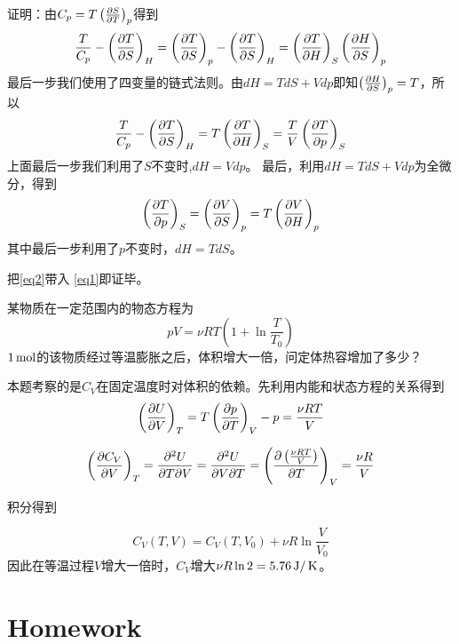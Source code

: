 \documentclass[CJK]{beamer}
\begin{document}
\begin{frame}
  \bch
  {\scriptsize
  证明：由$C_p = T\left(\frac{\partial S}{\partial T}\right)_{p}$得到
  $$ \frac{T}{C_p} - \left(\frac{\partial T}{\partial S}\right)_{H} = \left(\frac{\partial T}{\partial S}\right)_{p} - \left(\frac{\partial T}{\partial S}\right)_{H} = \left(\frac{\partial T}{\partial H}\right)_{S} \left(\frac{\partial H}{\partial S}\right)_{p} $$
  最后一步我们使用了四变量的链式法则。由$dH = TdS + Vdp$即知$\left(\frac{\partial H}{\partial S}\right)_{p} = T$，所以
  \begin{equation}
    \frac{T}{C_p} - \left(\frac{\partial T}{\partial S}\right)_{H} = T \left(\frac{\partial T}{\partial H}\right)_{S} = \frac{T}{V} \left(\frac{\partial T}{\partial p}\right)_{S} \label{eq1}
  \end{equation}
  上面最后一步我们利用了$S$不变时,$ dH = Vdp$。
  最后，利用$dH  = TdS +Vdp$为全微分，得到
  \begin{equation}
    \left(\frac{\partial T}{\partial p}\right)_{S} = \left(\frac{\partial V}{\partial S}\right)_{p} = T\left(\frac{\partial V}{\partial H}\right)_{p} \label{eq2}
  \end{equation}
  其中最后一步利用了$p$不变时，$dH = TdS$。

  把\eqref{eq2}带入 \eqref{eq1}即证毕。
  
  }
  \ech
\end{frame}

\begin{frame}
  \chtitle{\proid (\sfour)}
  \bch
  某物质在一定范围内的物态方程为
  $$ pV = \nu R T\left(1+\ln\frac{T}{T_0}\right) $$
  $1\,\mathrm{mol}$的该物质经过等温膨胀之后，体积增大一倍，问定体热容增加了多少？
  \ech
\end{frame}

\begin{frame}
  \bch
  {\small
    本题考察的是$C_V$在固定温度时对体积的依赖。先利用内能和状态方程的关系得到
    $$\left(\frac{\partial U}{\partial V}\right)_{T} = T\left(\frac{\partial p}{\partial T}\right)_{V} - p = \frac{\nu RT}{V} $$
    
  $$\left(\frac{\partial C_V}{\partial V}\right)_{T} = \frac{\partial^2U}{\partial T\partial V} = \frac{\partial^2U}{\partial V\partial T} = \left(\frac{\partial \left(\frac{\nu RT}{V}\right)}{\partial T}\right)_{V} =\frac{\nu R}{V} $$

    积分得到

    $$ C_V(T, V) = C_V(T, V_0) + \nu R \ln\frac{V}{V_0}$$
    因此在等温过程$V$增大一倍时，$C_V$增大$\nu R \ln 2 = 5.76 \,\mathrm{J}/\,\mathrm{K}$。

  }
  \ech
\end{frame}

\section{Homework}
\end{document}

